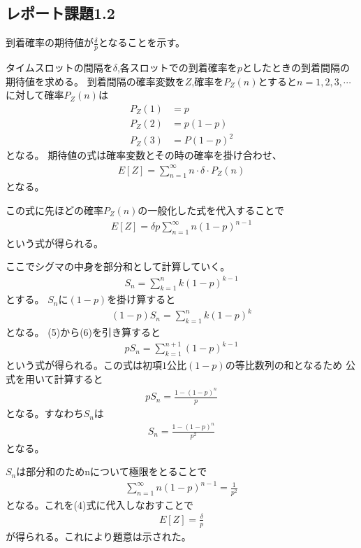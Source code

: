\documentclass[a4paper,11pt,dvipdfmx]{jsarticle}
\begin{document}
\subsection*{レポート課題1.2}
到着確率の期待値が$\frac{\delta}{p}$となることを示す。

タイムスロットの間隔を$\delta$,各スロットでの到着確率を$p$としたときの到着間隔の期待値を求める。
到着間隔の確率変数を$Z$,確率を$P_Z(n)$とすると$n=1,2,3,\cdots$に対して確率$P_Z(n)$は
\begin{equation}
    \begin{split}
        P_Z(1) &= p \\
        P_Z(2) &= p(1-p) \\
        P_Z(3) &= P(1-p)^2 
    \end{split}
\end{equation}
となる。
期待値の式は確率変数とその時の確率を掛け合わせ、
\begin{align}
    E[Z] = \sum_{n=1}^{\infty}n \cdot \delta \cdot P_Z(n) 
\end{align}
となる。

この式に先ほどの確率$P_Z(n)$の一般化した式を代入することで
\begin{align}
    E[Z] = \delta p\sum_{n=1}^{\infty}n(1-p)^{n-1}
\end{align}
という式が得られる。

ここでシグマの中身を部分和として計算していく。
\begin{align}
    S_n = \sum_{k=1}^{n}k(1-p)^{k-1}
\end{align}
とする。
$S_n$に$(1-p)$を掛け算すると
\begin{align}
    (1-p)S_n = \sum_{k=1}^{n}k(1-p)^k
\end{align}
となる。
(5)から(6)を引き算すると
\begin{align}
    pS_n = \sum_{k=1}^{n+1}(1-p)^{k-1}
\end{align}
という式が得られる。この式は初項$1$公比$(1-p)$の等比数列の和となるため
公式を用いて計算すると
\begin{align}
    pS_n = \frac{1-(1-p)^n}{p}
\end{align}
となる。すなわち$S_n$は
\begin{align}
    S_n = \frac{1-(1-p)^n}{p^2}
\end{align}
となる。

$S_n$は部分和のためnについて極限をとることで
\begin{align}
    \sum_{n=1}^{\infty}n(1-p)^{n-1} = \frac{1}{p^2}
\end{align}
となる。これを(4)式に代入しなおすことで
\begin{align}
    E[Z] = \frac{\delta}{p}
\end{align}
が得られる。これにより題意は示された。
\end{document}
